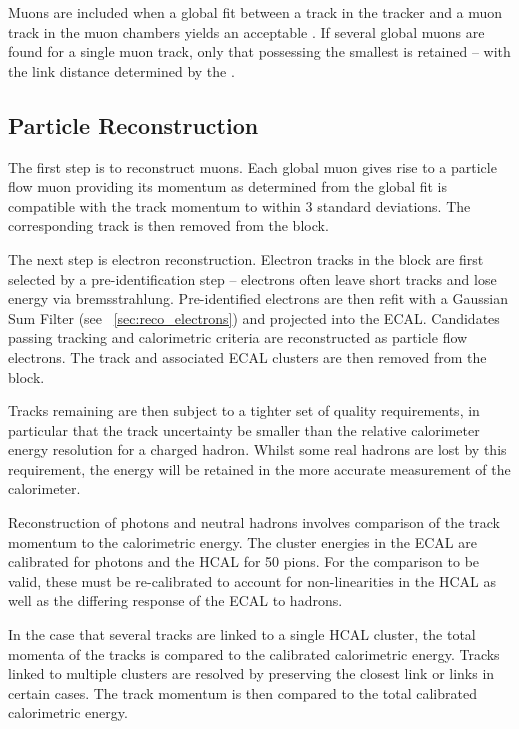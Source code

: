 Muons are included when a global fit between a track in the tracker and a muon
track in the muon chambers yields an acceptable \chisq. If several global muons
are found for a single muon track, only that possessing the smallest \chisq is
retained -- with the link distance determined by the \chisq.

\subsection{Particle Reconstruction}
The first step is to reconstruct muons. Each global muon gives rise to a
particle flow muon providing its momentum as determined from the global fit is
compatible with the track momentum to within 3 standard deviations. The
corresponding track is then removed from the block.

The next step is electron reconstruction. Electron tracks in the block are first
selected by a pre-identification step -- electrons often leave short tracks and
lose energy via bremsstrahlung. Pre-identified electrons are then refit with a
Gaussian Sum Filter (see \sec~\ref{sec:reco_electrons}) and projected into
the \ac{ECAL}.  Candidates passing tracking and calorimetric criteria are
reconstructed as particle flow electrons. The track and associated \ac{ECAL}
clusters are then removed from the block.

Tracks remaining are then subject to a tighter set of quality requirements, in
particular that the track \Pt uncertainty be smaller than the relative
calorimeter energy resolution for a charged hadron. Whilst some real hadrons are
lost by this requirement, the energy will be retained in the more accurate
measurement of the calorimeter.

Reconstruction of photons and neutral hadrons involves comparison of the track
momentum to the calorimetric energy. The cluster energies in the \ac{ECAL} are
calibrated for photons and the \ac{HCAL} for \unit{50}{\GeV} pions. For the
comparison to be valid, these must be re-calibrated to account for
non-linearities in the \ac{HCAL} as well as the differing response of the
\ac{ECAL} to hadrons.

In the case that several tracks are linked to a single \ac{HCAL} cluster, the
total momenta of the tracks is compared to the calibrated calorimetric energy.
Tracks linked to multiple clusters are resolved by preserving the closest link
or links in certain cases. The track momentum is then compared to the total
calibrated calorimetric energy.

